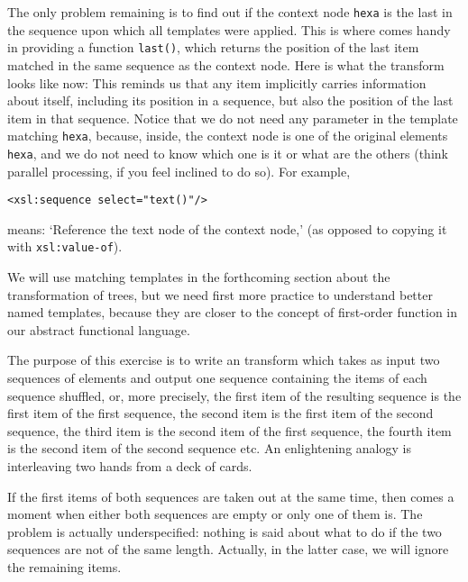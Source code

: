 The only problem remaining is to find out if the context node
\texttt{hexa} is the last in the sequence upon which all templates
were applied. This is where \XPath comes handy in providing a function
\texttt{last()}, which returns the position of the last item matched
in the same sequence as the context node. Here is what the transform
looks like now:
\noindent This reminds us that any item implicitly carries information
about itself, including its position in a sequence, but also the
position of the last item in that sequence. Notice that we do not need
any parameter in the template matching \texttt{hexa}, because, inside,
the context node is one of the original elements \texttt{hexa}, and we
do not need to know which one is it or what are the others (think
parallel processing, if you feel inclined to do so). For example,
\begin{verbatim}
<xsl:sequence select="text()"/>
\end{verbatim}
means: `Reference the text node of the context node,' (as opposed to
copying it with \texttt{xsl:value-of}).

We will use matching templates in the forthcoming section about the
transformation of trees, but we need first more practice to understand
better named templates, because they are closer to the concept of
first\hyp{}order function in our abstract functional language.


The purpose of this exercise is to write an \XSLT transform which
takes as input two sequences of elements and output one sequence
containing the items of each sequence shuffled, or, more precisely,
the first item of the resulting sequence is the first item of the
first sequence, the second item is the first item of the second
sequence, the third item is the second item of the first sequence, the
fourth item is the second item of the second sequence etc. An
enlightening analogy is interleaving two hands from a deck of cards.

If the first items of both sequences are taken out at the same time,
then comes a moment when either both sequences are empty or only one
of them is. The problem is actually underspecified: nothing is said
about what to do if the two sequences are not of the same
length. Actually, in the latter case, we will ignore the remaining
items.

